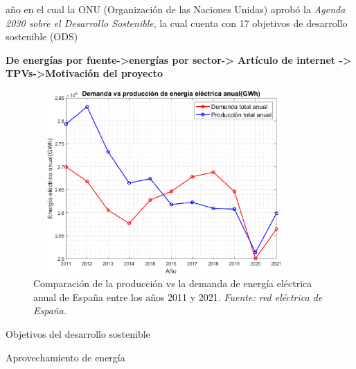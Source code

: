   año en el cual la ONU (Organización de las Naciones Unidas) aprobó la \textit{Agenda 2030 sobre el Desarrollo Sostenible}, la cual cuenta con 17 objetivos de desarrollo sostenible (ODS)

\textbf{De energías por fuente->energías por sector-> Artículo de internet -> TPVs->Motivación del proyecto}

\begin{figure}[H]
	\centering
	\includegraphics[width=10cm, height=7cm]{figuras/ProdcVSdemAnual}
	\caption[Producción vs demanda de energía eléctrica anual]{Comparación de la producción vs la demanda de energía eléctrica anual de España entre los años 2011 y 2021. \textit{Fuente: red eléctrica de España.} }
	\label{fig:prodcvsdemanual}
\end{figure}

\begin{figure}[h]

\end{figure}

Objetivos del desarrollo sostenible

{Aprovechamiento de energía}



